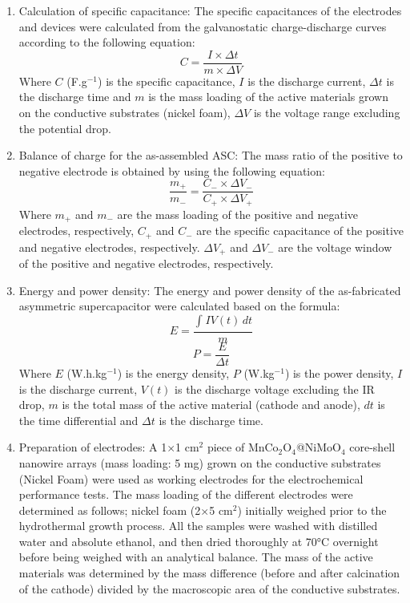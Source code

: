\documentclass[reprint,amsmath,amssymb,aps,floatfix,
]{revtex4-2}
\begin{document}
\begin{enumerate}
    \item Calculation of specific capacitance: The specific capacitances of the electrodes and devices were calculated from the galvanostatic charge-discharge curves according to the following equation: \begin{equation}C = \frac{I \times \Delta t}{m \times \Delta V}\end{equation} Where $C$ (F.g$^{-1}$) is the specific capacitance, $I$ is the discharge current, $\Delta t$ is the discharge time and $m$ is the mass loading of the active materials grown on the conductive substrates (nickel foam), $\Delta V$ is the voltage range excluding the potential drop.
    \item Balance of charge for the as-assembled ASC: The mass ratio of the positive to negative electrode is obtained by using the following equation: \begin{equation}\frac{m_+}{m_-} = \frac{C_- \times \Delta V_-}{C_+ \times \Delta V_+}\end{equation} Where $m_+$ and $m_-$ are the mass loading of the positive and negative electrodes, respectively, $C_+$ and $C_-$ are the specific capacitance of the positive and negative electrodes, respectively. $\Delta V_+$ and $\Delta V_-$ are the voltage window of the positive and negative electrodes, respectively.
    \item Energy and power density: The energy and power density of the as-fabricated asymmetric supercapacitor were calculated based on the formula: \begin{equation}E = \frac{\int_{}^{} IV(t)\,dt}{m}\end{equation} \begin{equation}P = \frac{E}{\Delta t}\end{equation} Where $E$ (W.h.kg$^{-1}$) is the energy density, $P$ (W.kg$^{-1}$) is the power density, $I$ is the discharge current, $V(t)$ is the discharge voltage excluding the IR drop, $m$ is the total mass of the active material (cathode and anode), $dt$ is the time differential and $\Delta t$ is the discharge time.
    \item Preparation of electrodes: A 1$\times$1 cm$^2$ piece of MnCo$_2$O$_4$@NiMoO$_4$ core-shell nanowire arrays (mass loading: 5 mg) grown on the conductive substrates (Nickel Foam) were used as working electrodes for the electrochemical performance tests. The mass loading of the different electrodes were determined as follows; nickel foam (2$\times$5 cm$^2$) initially weighed prior to the hydrothermal growth process. All the samples were washed with distilled water and absolute ethanol, and then dried thoroughly at \ang{70}C overnight before being weighed with an analytical balance. The mass of the active materials was determined by the mass difference (before and after calcination of the cathode) divided by the macroscopic area of the conductive substrates.
\end{enumerate}
\begin{center}
\end{center}
\end{document}
